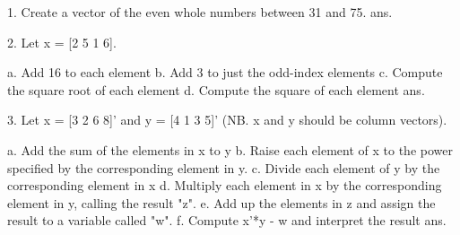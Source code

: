 
1. Create a vector of the even whole numbers between 31 and 75. 
    ans.

2. Let x = [2 5 1 6].

  a. Add 16 to each element
  b. Add 3 to just the odd-index elements
  c. Compute the square root of each element
  d. Compute the square of each element
    ans.

3. Let x = [3 2 6 8]' and y = [4 1 3 5]' (NB. x and y should be column vectors).

  a. Add the sum of the elements in x to y
  b. Raise each element of x to the power specified by the corresponding
     element in y.
  c. Divide each element of y by the corresponding element in x
  d. Multiply each element in x by the corresponding element in y, calling
     the result "z".
  e. Add up the elements in z and assign the result to a variable called "w".
  f. Compute x'*y - w and interpret the result
    ans.
